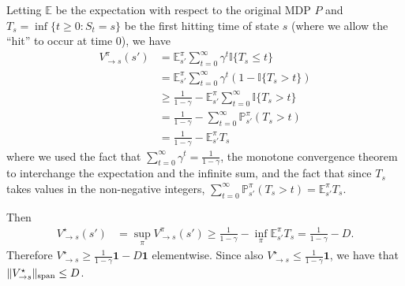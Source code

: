 \documentclass{article}
\theoremstyle{plain}
\theoremstyle{plain}
\theoremstyle{remark}
\theoremstyle{plain}
\theoremstyle{plain}
\renewcommand{\P}{\mathbb{P}}
\newcommand{\E}{\mathbb{E}}
\newcommand{\Ehat}{\widehat{\mathbb{E}}}
\newcommand{\Phat}{\widehat{P}}
\newcommand{\Vhat}{\widehat{V}}
\newcommand{\one}{\mathbf{1}}
\newcommand{\ind}{\mathbb{I}}
\begin{document}
    Letting $\E$ be the expectation with respect to the original MDP $P$ and $T_{s} = \inf \{t \geq 0: S_t =s\}$ be the first hitting time of state $s$ (where we allow the ``hit'' to occur at time $0$), we have
    \begin{align*}
        V^\pi_{\to s}(s') &= \E_{s'}^\pi \sum_{t = 0}^\infty \gamma^t \ind\{T_{s} \leq t\} \\
        &= \E_{s'}^\pi \sum_{t = 0}^\infty \gamma^t\left(1 - \ind\{T_{s} > t\}\right) \\
        &\geq \frac{1}{1-\gamma} - \E_{s'}^\pi \sum_{t = 0}^\infty \ind\{T_{s} > t\} \\
        &= \frac{1}{1-\gamma} -  \sum_{t = 0}^\infty \P_{s'}^\pi\left(T_{s} > t\right) \\
        &= \frac{1}{1-\gamma} - \E_{s'}^\pi T_{s}
    \end{align*}
    where we used the fact that $\sum_{t=0}^\infty \gamma^t = \frac{1}{1-\gamma}$, the monotone convergence theorem to interchange the expectation and the infinite sum, and the fact that since $T_{s}$ takes values in the non-negative integers, $\sum_{t = 0}^\infty \P_{s'}^\pi\left(T_{s} > t\right) = \E_{s'}^\pi T_{s}$.

    Then
    \begin{align*}
        V^\star_{\to s}(s') &= \sup_{\pi} V^\pi_{\to s}(s') \geq \frac{1}{1-\gamma} - \inf_{\pi} \E_{s'}^\pi T_{s} = \frac{1}{1-\gamma} - D.
    \end{align*}
    Therefore $V^\star_{\to s} \geq \frac{1}{1-\gamma}\one - D\one$ elementwise. Since also  $V^\star_{\to s} \leq \frac{1}{1-\gamma}\one$, we have that $\Vert V^\star_{\to s}\Vert _{\textnormal{span}} \leq D$.

\end{document}
